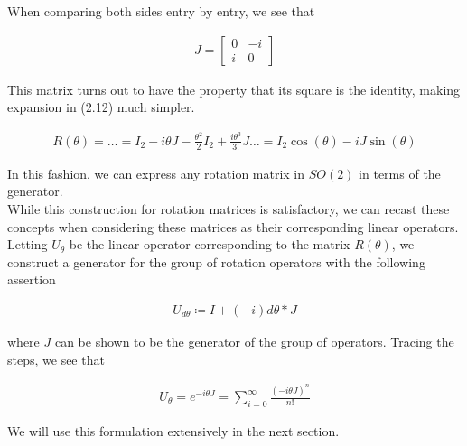 \documentclass[10pt]{ucthesis}
\begin{document}
When comparing both sides entry by entry, we see that 

\begin{equation}
	\begin{aligned}
		J = \begin{bmatrix}
			0 & -i \\
			i & 0
		\end{bmatrix}
	\end{aligned}
\end{equation}

This matrix turns out to have the property that its square is the identity, making expansion in (2.12) much simpler.

\begin{equation}
	\begin{aligned}
		R(\theta) = \hdots = I_2 -i\theta J - \frac{\theta^2}{2} I_2 + \frac{i\theta^3}{3!}J \hdots = I_2 \cos(\theta) -iJ \sin(\theta) 
	\end{aligned}
\end{equation}

In this fashion, we can express any rotation matrix in $SO(2)$ in terms of the generator. \\

While this construction for rotation matrices is satisfactory, we can recast these concepts when considering these matrices as their corresponding linear operators. Letting $U_\theta$ be the linear operator corresponding to the matrix $R(\theta)$, we construct a generator for the group of rotation operators with the following assertion

\begin{equation}
	\begin{aligned}
		U_{d\theta} \coloneq I + (-i)d\theta * J
	\end{aligned}
\end{equation}  

\noindent where $J$ can be shown to be the generator of the group of operators. Tracing the steps, we see that 

\begin{equation}
	\begin{aligned}
		U_\theta = e^{-i\theta J} = \sum_{i=0}^\infty \frac{(-i\theta J)^n}{n!}
	\end{aligned}
\end{equation}  


We will use this formulation extensively in the next section.
\end{document}
